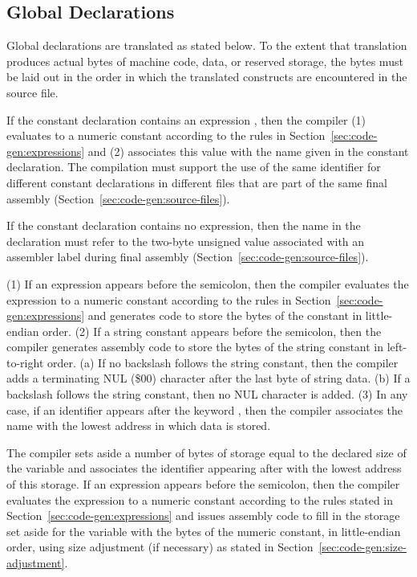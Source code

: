 \documentclass[10pt]{article}
\begin{document}
\subsection{Global Declarations}
\label{sec:code-gen:global-decls}

Global declarations are translated as stated below.  To the extent
that translation produces actual bytes of machine code, data, or
reserved storage, the bytes must be laid out in the order in which the
translated constructs are encountered in the source file.

 If the constant declaration contains
an expression , then the compiler (1) evaluates
 to a numeric constant according to the rules in
Section~\ref{sec:code-gen:expressions} and (2) associates this value
with the name given in the constant declaration.  The compilation must
support the use of the same identifier for different constant
declarations in different files that are part of the same final
assembly (Section~\ref{sec:code-gen:source-files}).

If the constant declaration contains no expression, then the name in
the declaration must refer to the two-byte unsigned value associated
with an assembler label during final assembly
(Section~\ref{sec:code-gen:source-files}).

 (1) If an expression appears before the
semicolon, then the compiler evaluates the expression to a numeric
constant according to the rules in
Section~\ref{sec:code-gen:expressions} and generates code to store the
bytes of the constant in little-endian order.  (2) If a string
constant appears before the semicolon, then the compiler generates
assembly code to store the bytes of the string constant in
left-to-right order.  (a) If no backslash \kwd{\bs} follows the string
constant, then the compiler adds a terminating NUL (\$00) character
after the last byte of string data. (b) If a backslash follows the
string constant, then no NUL character is added.  (3) In any case, if
an identifier appears after the keyword , then the compiler
associates the name with the lowest address in which data is stored.

 The compiler sets aside a
number of bytes of storage equal to the declared size of the variable
and associates the identifier appearing after  with the
lowest address of this storage.  If an expression appears before the
semicolon, then the compiler evaluates the expression to a numeric
constant according to the rules stated in
Section~\ref{sec:code-gen:expressions} and issues assembly code to
fill in the storage set aside for the variable with the bytes of the
numeric constant, in little-endian order, using size adjustment (if
necessary) as stated in Section~\ref{sec:code-gen:size-adjustment}.
\end{document}
